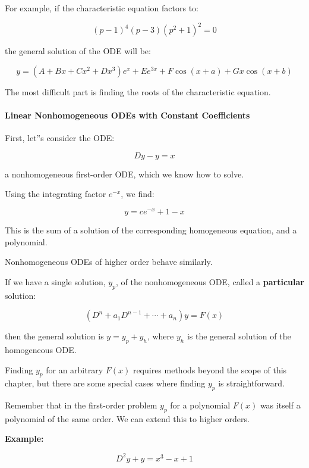 For example, if the characteristic equation factors to:

$$(p - 1)^4(p - 3)(p^2 + 1)^2 = 0$$

the general solution of the ODE will be:

$$y = (A + Bx + Cx^2 + Dx^3)e^x + Ee^{3x} + F \cos (x + a) + Gx \cos(x + b)$$



The most difficult part is finding the roots of the characteristic equation.



\paragraph{Linear Nonhomogeneous ODEs with Constant Coefficients}

First, let''s consider the ODE:

$$Dy - y = x$$

a nonhomogeneous first-order ODE, which we know how to solve.



Using the integrating factor $e^{-x}$, we find:

$$y = c e^{-x} + 1 - x$$



This is the sum of a solution of the corresponding homogeneous equation, and a polynomial.



Nonhomogeneous ODEs of higher order behave similarly.



If we have a single solution, $y_p$, of the nonhomogeneous ODE, called a \textbf{particular} solution:

$$(D^n + a_1 D^{n-1} + \cdots + a_n)y = F(x)$$

then the general solution is $y = y_p + y_h$, where $y_h$ is the general solution of the homogeneous ODE.



Finding $y_p$ for an arbitrary $F(x)$ requires methods beyond the scope of this chapter, but there are some special cases where finding $y_p$ is straightforward.



Remember that in the first-order problem $y_p$ for a polynomial $F(x)$ was itself a polynomial of the same order. We can extend this to higher orders.



\textbf{Example:}

$$D^2 y + y = x^3 - x + 1$$


